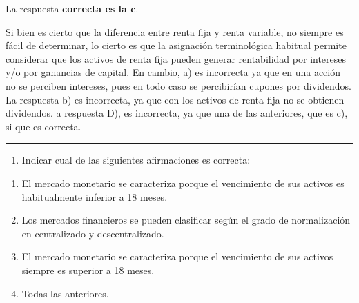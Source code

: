 \documentclass[
  letterpaper,
  DIV=11,
  numbers=noendperiod]{scrreprt}
\providecommand{\tightlist}{%
  \setlength{\itemsep}{0pt}\setlength{\parskip}{0pt}}\usepackage{longtable,booktabs,array}
\begin{document}
\begin{tcolorbox}[enhanced jigsaw, left=2mm, opacityback=0, colback=white, breakable, arc=.35mm, bottomrule=.15mm, rightrule=.15mm, toprule=.15mm, leftrule=.75mm, colframe=quarto-callout-tip-color-frame]
\begin{minipage}[t]{5.5mm}
\textcolor{quarto-callout-tip-color}{\faLightbulb}
\end{minipage}%
\begin{minipage}[t]{\textwidth - 5.5mm}

La respuesta \textbf{correcta es la c}.

Si bien es cierto que la diferencia entre renta fija y renta variable,
no siempre es fácil de determinar, lo cierto es que la asignación
terminológica habitual permite considerar que los activos de renta fija
pueden generar rentabilidad por intereses y/o por ganancias de capital.
En cambio, a) es incorrecta ya que en una acción no se perciben
intereses, pues en todo caso se percibirían cupones por dividendos. La
respuesta b) es incorrecta, ya que con los activos de renta fija no se
obtienen dividendos. a respuesta D), es incorrecta, ya que una de las
anteriores, que es c), si que es correcta.

\end{minipage}%
\end{tcolorbox}

\begin{center}\rule{0.5\linewidth}{0.5pt}\end{center}

\begin{enumerate}
\def\labelenumi{\arabic{enumi}.}
\setcounter{enumi}{18}
\tightlist
\item
  Indicar cual de las siguientes afirmaciones es correcta:
\end{enumerate}

\begin{enumerate}
\def\labelenumi{\alph{enumi})}
\item
  El mercado monetario se caracteriza porque el vencimiento de sus
  activos es habitualmente inferior a 18 meses.
\item
  Los mercados financieros se pueden clasificar según el grado de
  normalización en centralizado y descentralizado.
\item
  El mercado monetario se caracteriza porque el vencimiento de sus
  activos siempre es superior a 18 meses.
\item
  Todas las anteriores.
\end{enumerate}
\end{document}
